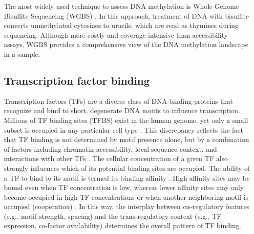 \begin{dissertationintroduction}
The most widely used technique to assess DNA methylation is Whole Genome Bisulfite Sequencing (WGBS) \cite{Cokus2008-jt}. In this approach, treatment of DNA with bisulfite converts unmethylated cytosines to uracils, which are read as thymines during sequencing. Although more costly and coverage-intensive than accessibility assays, WGBS provides a comprehensive view of the DNA methylation landscape in a sample.

\subsection{Transcription factor binding}

Transcription factors (TFs) are a diverse class of DNA-binding proteins that recognize and bind to short, degenerate DNA motifs \cite{Isbel2022-fj,Stormo2000-ei,Badis2009-hv} to influence transcription. Millions of TF binding sites (TFBS) exist in the human genome, yet only a small subset is occupied in any particular cell type \cite{Spitz2012-la}. This discrepancy reflects the fact that TF binding is not determined by motif presence alone, but by a combination of factors including chromatin accessibility, local sequence context, and interactions with other TFs \cite{Shlyueva2014-nr}. The cellular concentration of a given TF also strongly influences which of its potential binding sites are occupied. The ability of a TF to bind to its motif is termed its binding affinity \cite{Stormo2010-xm}. High affinity sites may be bound even when TF concentration is low, whereas lower affinity sites may only become occupied in high TF concentrations or when another neighboring motif is occupied (cooperation) \cite{Reiter2017-ru}. In this way, the interplay between cis-regulatory features (e.g., motif strength, spacing) and the trans-regulatory context (e.g., TF expression, co-factor availability) determines the overall pattern of TF binding.


\end{dissertationintroduction}
